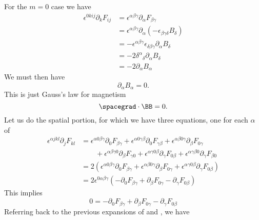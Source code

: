 %
For the \(m= 0\) case we have
%
\begin{equation}\label{eqn:relativisticElectrodynamicsL11b:1400}
\begin{aligned}
\epsilon^{0 k i j} \partial_k F_{i j}
&=
\epsilon^{\alpha \beta \gamma} \partial_\alpha F_{\beta \gamma} \\
&=
\epsilon^{\alpha \beta \gamma} \partial_\alpha (-\epsilon_{\beta \gamma \delta} B_\delta) \\
&=
-\epsilon^{\alpha \beta \gamma} \epsilon_{\delta \beta \gamma }
\partial_\alpha B_\delta \\
&=
- 2 {\delta^\alpha}_\delta \partial_\alpha B_\delta \\
&=
- 2 \partial_\alpha B_\alpha
\end{aligned}
\end{equation}
%
We must then have
%
\begin{equation}\label{eqn:relativisticElectrodynamicsL11:830}
\partial_\alpha B_\alpha = 0.
\end{equation}
%
This is just Gauss's law for magnetism
%
\begin{equation}\label{eqn:relativisticElectrodynamicsL11:850}
\spacegrad \cdot \BB = 0.
\end{equation}
%
Let us do the spatial portion, for which we have three equations, one for each \(\alpha\) of
%
\begin{equation}\label{eqn:relativisticElectrodynamicsL11b:1420}
\begin{aligned}
\epsilon^{\alpha j k l} \partial_j F_{k l}
&=
\epsilon^{\alpha 0 \beta \gamma} \partial_0 F_{\beta \gamma}
+\epsilon^{\alpha 0 \gamma \beta} \partial_0 F_{\gamma \beta}
+\epsilon^{\alpha \beta 0 \gamma} \partial_\beta F_{0 \gamma} \\
&\qquad +\epsilon^{\alpha \beta \gamma 0} \partial_\beta F_{\gamma 0}
+\epsilon^{\alpha \gamma 0 \beta} \partial_\gamma F_{0 \beta}
+\epsilon^{\alpha \gamma \beta 0} \partial_\gamma F_{\beta 0} \\
&=
2 \left(
\epsilon^{\alpha 0 \beta \gamma} \partial_0 F_{\beta \gamma}
+\epsilon^{\alpha \beta 0 \gamma} \partial_\beta F_{0 \gamma}
+\epsilon^{\alpha \gamma 0 \beta} \partial_\gamma F_{0 \beta}
\right) \\
&=
2 \epsilon^{0 \alpha \beta \gamma} \left(
-\partial_0 F_{\beta \gamma}
+\partial_\beta F_{0 \gamma}
- \partial_\gamma F_{0 \beta}
\right)
\end{aligned}
\end{equation}
%
This implies
%
\begin{equation}\label{eqn:relativisticElectrodynamicsL11:1320}
0 =
-\partial_0 F_{\beta \gamma}
+\partial_\beta F_{0 \gamma}
- \partial_\gamma F_{0 \beta}
\end{equation}
%
Referring back to the previous expansions of  and , we have

